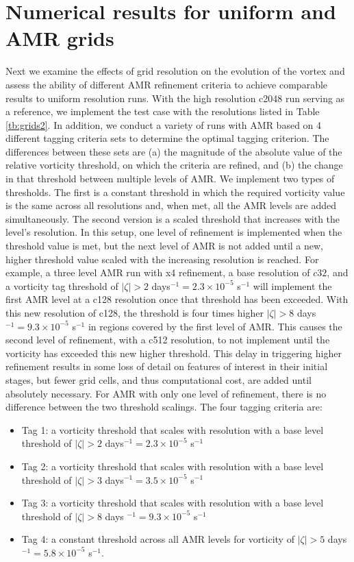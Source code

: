 \section{Numerical results for uniform and AMR grids}
\label{sec:wetvortresults}
Next we examine the effects of grid resolution on the evolution of the vortex and assess 
the ability of different AMR refinement criteria to achieve comparable results to uniform
resolution runs. With the high resolution c2048 run serving as a reference,
we implement the test case with the resolutions listed in Table \ref{tb:grids2}.
In addition, we conduct a variety of runs with AMR based on 
4 different tagging criteria sets to determine the optimal tagging criterion. 
The differences between these sets are (a) the magnitude of the absolute value of the relative 
vorticity threshold, on which the criteria are refined, and (b) the change in that threshold between multiple
levels of AMR. We implement two types of thresholds.
The first is a constant threshold in which the required vorticity value is the same 
across all resolutions and, when met, all the AMR levels are added simultaneously.
The second version is a scaled threshold that increases with the level's resolution.
In this setup, one level of refinement is implemented when the threshold value is met, but
the next level of AMR is not added until a new, higher threshold value scaled with the increasing resolution is reached.
For example, a three level AMR run with x4 refinement, a base resolution of $c32$, 
and a vorticity tag threshold of 
$|\zeta| > 2$ days$^{-1} = 2.3 \times 10^{-5}$ s$^{-1}$ will implement
the first AMR level at a c128 resolution once that threshold has been exceeded. With this new
resolution of c128, the threshold is four times higher 
$|\zeta| > 8$ days$^{-1} = 9.3 \times 10^{-5}$ s$^{-1}$ 
in regions covered by the first level of AMR. This causes the second
level of refinement, with a c512 resolution, to not implement until the vorticity has 
exceeded this new higher threshold. This delay in triggering higher refinement results 
in some loss of detail on features of interest in their initial stages, but fewer grid cells, 
and thus computational cost, are added until absolutely necessary.
For AMR with only one level of refinement, there is no difference between
the two threshold scalings.
The four tagging criteria are:
\begin{itemize}
    \item
        Tag 1: a vorticity threshold that scales with resolution 
        with a base level threshold of 
        $|\zeta| > 2$ days$^{-1} = 2.3 \times 10^{-5}$ s$^{-1}$
     \item
        Tag 2: a vorticity threshold that scales with resolution 
        with a base level threshold of 
        $|\zeta| > 3$ days$^{-1} = 3.5 \times 10^{-5}$ s$^{-1}$
     \item
        Tag 3: a vorticity threshold that scales with resolution 
        with a base level threshold of 
        $|\zeta| > 8$ days $^{-1} = 9.3 \times 10^{-5}$ s$^{-1}$
     \item
        Tag 4: a constant threshold across all AMR levels for vorticity of 
        $|\zeta| > 5$ days $^{-1} = 5.8 \times 10^{-5}$ s$^{-1}$.
\end{itemize}
